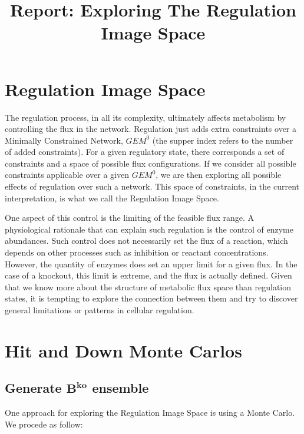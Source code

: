 \documentclass[11pt, letterpaper]{article}
\title{\textbf{Report: Exploring The Regulation Image Space}}
\date{}
\author{}
\newcommand{\vecsym}[1]{\boldsymbol{#1}}
\begin{document}
\maketitle


\section{Regulation Image Space}


The regulation process, in all its complexity, ultimately affects metabolism by controlling the flux in the network.
Regulation just adds extra constraints over a Minimally Constrained Network, $GEM^{0}$ (the supper index refers to the number of added constraints).
For a given regulatory state, there corresponds a set of constraints and a space of possible flux configurations.
If we consider all possible constraints applicable over a given $GEM^{0}$, we are then exploring all possible effects of regulation over such a network.
This space of constraints, in the current interpretation, is what we call the Regulation Image Space.


One aspect of this control is the limiting of the feasible flux range.
A physiological rationale that can explain such regulation is the control of enzyme abundances.
Such control does not necessarily set the flux of a reaction, which depends on other processes such as inhibition or reactant concentrations.
However, the quantity of enzymes does set an upper limit for a given flux.
In the case of a knockout, this limit is extreme, and the flux is actually defined.
Given that we know more about the structure of metabolic flux space than regulation states, it is tempting to explore the connection between them and try to discover general limitations or patterns in cellular regulation.


\section{Hit and Down Monte Carlos}


\subsection{Generate \texorpdfstring{$\vecsym{B^{ko}}$}{Bth} ensemble}


One approach for exploring the Regulation Image Space is using a Monte Carlo.
We procede as follow:
\end{document}

